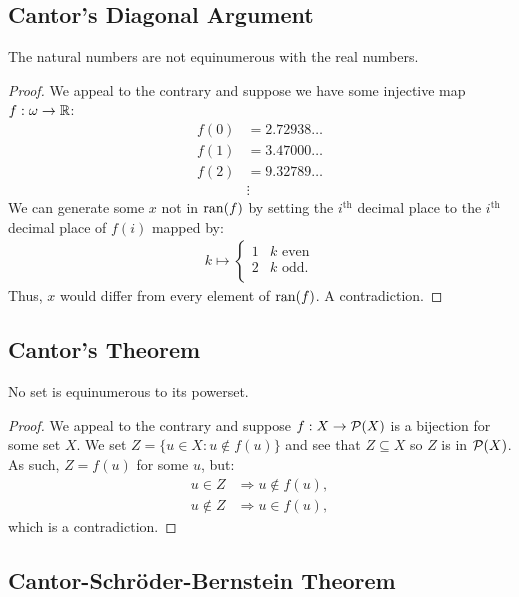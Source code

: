 \subsection{Cantor's Diagonal Argument}

The natural numbers are not equinumerous with the real numbers.

\begin{proof}
    We appeal to the contrary and suppose we have some injective map \linebreak
    $f : \omega \to \mathbb{R}$: \begin{align*}
        f(0) &= 2.72938 \ldots \\
        f(1) &= 3.47000 \ldots \\
        f(2) &= 9.32789 \ldots \\
        &\vdots 
    \end{align*} We can generate some $x$ not in $\operatorname{ran}(f)$ by
    setting the $i^{\text{th}}$ decimal place to the $i^{\text{th}}$
    decimal place of $f(i)$ mapped by: \begin{align*}
        k \mapsto \begin{cases}
            1 & k \text{ even} \\
            2 & k \text{ odd.} \\
        \end{cases}
    \end{align*} Thus, $x$ would differ from every element of $\operatorname{ran}(f)$.
    A contradiction.
\end{proof}

\subsection{Cantor's Theorem}

No set is equinumerous to its powerset.

\begin{proof}
    We appeal to the contrary and suppose $f : X \to \mathcal{P}(X)$ is a bijection
    for some set $X$. We set $Z = \{u \in X : u \notin f(u)\}$ and see that
    $Z \subseteq X$ so $Z$ is in $\mathcal{P}(X)$. As such, $Z = f(u)$ for some
    $u$, but:
    \begin{align*}
        u \in Z &\Longrightarrow u \notin f(u), \\
        u \notin Z &\Longrightarrow u \in f(u),
    \end{align*} which is a contradiction.
\end{proof}

\subsection{Cantor-Schröder-Bernstein Theorem}

